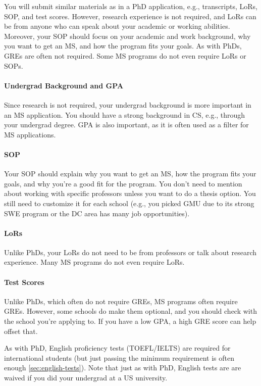 \documentclass[oneside,11pt]{book}
\begin{document}
You will submit similar materials as in a PhD application, e.g., transcripts, LoRs, SOP, and test scores.  However, research experience is not required, and LoRs can be from anyone who can speak about your academic or working abilities. Moreover, your SOP should focus on your academic and work background, why you want to get an MS, and how the program fits your goals. As with PhDs, GREs are often not required. Some MS programs do not even require LoRs or SOPs.  

\paragraph{Undergrad Background and GPA} Since research is not required, your undergrad background is more important in an MS application.  You should have a strong background in CS, e.g., through your undergrad degree.  GPA is also important, as it is often used as a filter for MS applications.

\paragraph{SOP} Your SOP should explain why you want to get an MS, how the program fits your goals, and why you're a good fit for the program.  You don't need to mention about working with specific professors unless you want to do a thesis option. You still need to customize it for each school (e.g., you picked GMU due to its strong SWE program or the DC area has many job opportunities).

\paragraph{LoRs} Unlike PhDs, your LoRs do not need to be from professors or talk about research experience. Many MS programs do not even require LoRs.

\paragraph{Test Scores} Unlike PhDs, which often do not require GREs, MS programs often require GREs.  However, some schools do make them optional, and you should check with the school you're applying to.  If you have a low GPA, a high GRE score can help offset that. 

As with PhD, English proficiency tests (TOEFL/IELTS) are required for international students (but just passing the minimum requirement is often enough \autoref{sec:english-tests}). Note that just as with PhD, English tests are are waived if you did your undergrad at a US university.
\end{document}
